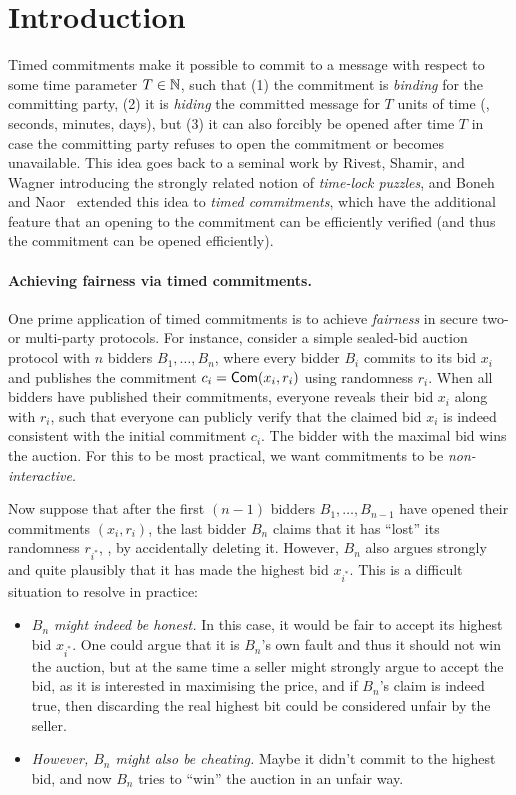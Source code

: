 \section{Introduction}\label{sec:intro}

Timed commitments make it possible to commit to a message with respect to some time parameter $T \in \mathbb{N}$, such that (1) the commitment is \emph{binding} for the committing party, (2) it is \emph{hiding} the committed message for $T$ units of time (\eg, seconds, minutes, days), but (3) it can also forcibly be opened after time $T$ in case the committing party refuses to open the commitment or becomes unavailable. This idea goes back to a seminal work by Rivest, Shamir, and Wagner \cite{RSW96} introducing the strongly related notion of \emph{time-lock puzzles}, and Boneh and Naor~\cite{C:BonNao00} extended this idea to \emph{timed commitments}, which have the additional feature that an opening to the commitment can be efficiently verified (and thus the commitment can be opened efficiently).

\paragraph{Achieving fairness via timed commitments.}
One prime application of timed commitments is to achieve \emph{fairness} in secure two- or multi-party protocols. For instance, consider a simple sealed-bid auction protocol with $n$ bidders $B_1, \ldots, B_n$, where every bidder $B_i$ commits to its bid $x_i$ and publishes the commitment $c_i = \mathsf{Com}(x_i,r_i)$ using randomness $r_i$. When all bidders have published their commitments, everyone reveals their bid $x_i$ along with $r_i$, such that everyone can publicly verify that the claimed bid $x_i$ is indeed consistent with the initial commitment $c_i$. The bidder with the maximal bid wins the auction.
For this to be most practical, we want commitments to be \emph{non-interactive}.

Now suppose that after the first $(n-1)$ bidders $B_1, \ldots, B_{n-1}$ have opened their commitments $(x_i, r_i)$, the last bidder $B_n$ claims that it has ``lost'' its randomness $r_{i^*}$, \eg, by accidentally deleting it. However, $B_n$ also argues strongly and quite plausibly that it has made the highest bid $x_{i^*}$. This is a difficult situation to resolve in practice:
\begin{itemize}
	\item \emph{$B_n$ might indeed be honest.} In this case, it would be fair to accept its highest bid $x_{i^*}$. One could argue that it is $B_n$'s own fault and thus it should not win the auction, but at the same time a seller might strongly argue to accept the bid, as it is interested in maximising the price, and if $B_n$'s claim is indeed true, then discarding the real highest bit could be considered unfair by the seller.
	\item \emph{However, $B_n$ might also be cheating.} Maybe it didn't commit to the highest bid, and now $B_n$ tries to ``win'' the auction in an unfair way.
\end{itemize}

